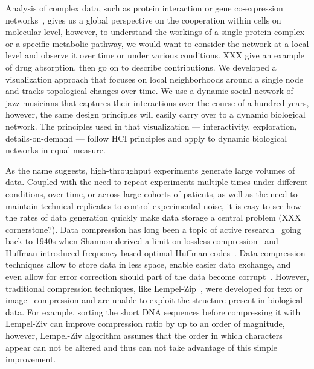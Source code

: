 
Analysis of complex data, such as protein interaction or gene co-expression networks~\cite{GSNs}, gives us a global perspective on the cooperation within cells on molecular level, however, to understand the workings of a single protein complex or a specific metabolic pathway, we would want to consider the network at a local level and observe it over time or under various conditions. 
XXX give an example of drug absorption, then go on to describe contributions. 
We developed a visualization approach that focuses on local neighborhoods around a single node and tracks topological changes over time. We use a dynamic social network of jazz musicians that captures their interactions over the course of a hundred years, however, the same design principles will easily carry over to a dynamic biological network. The principles used in that visualization --- interactivity, exploration, details-on-demand --- follow HCI principles and apply to dynamic biological networks in equal measure.


As the name suggests, high-throughput experiments generate large volumes of  data. Coupled with the need to repeat experiments multiple times under different conditions, over time, or across large cohorts of patients, as well as the need to maintain technical replicates to control experimental noise, it is easy to see how the rates of data generation quickly make data storage a central problem (XXX cornerstone?). Data compression has long been a topic of active research~\cite{CompressionReview} going back to 1940s when Shannon derived a limit on lossless compression~\cite{Shannon} and Huffman introduced frequency-based optimal Huffman codes~\cite{Huffman}. Data compression techniques allow to store data in less space, enable easier data exchange, and even allow for error correction should part of the data become corrupt~\cite{smth}. However, traditional compression techniques, like Lempel-Zip~\cite{LempelZiv}, were developed for text or image~\cite{GIF} compression and are unable to exploit the structure present in biological data. For example, sorting the short DNA sequences before compressing it with Lempel-Ziv can improve compression ratio by up to an order of magnitude, however, Lempel-Ziv algorithm assumes that the order in which characters appear can not be altered and thus can not take advantage of this simple improvement. 

